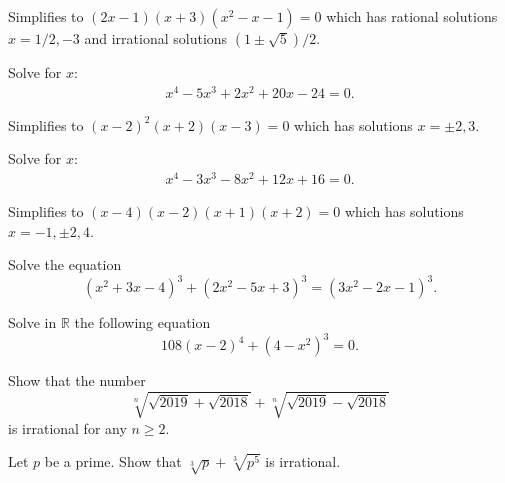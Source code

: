 \begin{solution}
    Simplifies to $(2x-1)(x+3)(x^2-x-1)=0$ which has rational solutions $x=1/2,-3$ and irrational solutions $(1\pm\sqrt{5})/2$.
\end{solution}


    \begin{question}
        Solve for $x$:
        \begin{align*}
            x^4-5x^3+2x^2+20x-24=0.
        \end{align*}
    \end{question}

\begin{solution}
    Simplifies to $(x-2)^2(x+2)(x-3)=0$ which has solutions $x=\pm 2, 3$.
\end{solution}


    \begin{question}
        Solve for $x$:
        \begin{align*}
            x^4-3x^3-8x^2+12x+16=0.
        \end{align*}
    \end{question}

\begin{solution}
    Simplifies to $(x - 4) (x - 2) (x + 1) (x + 2) =0$ which has solutions $x=-1,\pm 2, 4$.
\end{solution}


\begin{question}[name={2002 Croatia}]
    Solve the equation $$\left(x^2+3x-4\right)^3+\left(2x^2-5x+3\right)^3=\left(3x^2-2x-1\right)^3.$$
\end{question}

\begin{question}[name={2019 Greece}]
    Solve in $\mathbb{R}$ the following equation
    \[108 (x-2)^4 + (4- x^2)^3 = 0.\]
\end{question}

\begin{question}[name={2018 Romanian District}]
    Show that the number
    \[\sqrt[n]{\sqrt{2019} + \sqrt{2018}} + \sqrt[n]{\sqrt{2019} - \sqrt{2018}}\]
    is irrational for any $n\ge 2$.
\end{question}


\begin{question}[name={2017 Thailand}]
    Let $p$ be a prime. Show that $\sqrt[3]{p} +\sqrt[3]{p^5} $ is irrational.
\end{question}


